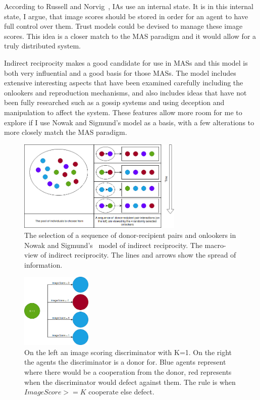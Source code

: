 \documentclass[]{final_report}
\begin{document}
According to Russell and Norvig~\cite{russell2016artificial}, IAs use an internal state. It is in this internal state, I argue, that image scores should be stored in order for an agent to have full control over them. Trust models could be devised to manage these image scores. This idea is a closer match to the MAS paradigm and it would allow for a truly distributed system.\par
Indirect reciprocity makes a good candidate for use in MASs and this model is both very influential and a good basis for those MASs. The model includes extensive interesting aspects that have been examined carefully including the onlookers and reproduction mechanisms, and also includes ideas that have not been fully researched such as a gossip systems and using deception and manipulation to affect the system. These features allow more room for me to explore if I use Nowak and Sigmund's model as a basis, with a few alterations to more closely match the MAS paradigm.
\begin{figure}
	\center
	\includegraphics[width=0.7\textwidth]{Onlookers.png}
	\caption{The selection of a sequence of donor-recipient pairs and onlookers in Nowak and Sigmund's~\cite{evol_indirect_image} model of indirect reciprocity. The macro-view of indirect reciprocity. The lines and arrows show the spread of information.}
	\label{fig:onlookers}
\end{figure}
\begin{figure}
	\center
	\includegraphics[width=0.3\textwidth]{Image_Scoring.png}
	\caption{On the left an image scoring discriminator with K=1. On the right the agents the discriminator is a donor for. Blue agents represent where there would be a cooperation from the donor, red represents when the discriminator would defect against them. The rule is when $Image Score >= K$ cooperate else defect.}
	\label{fig:image_discriminator}
\end{figure}
\end{document}
